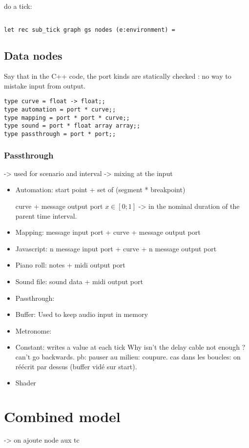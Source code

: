 \documentclass[applsci,article,submit,moreauthors,pdftex,10pt,a4paper]{mdpi}
\begin{document}
do a tick: 

\begin{lstlisting}

let rec sub_tick graph gs nodes (e:environment) =
\end{lstlisting}


\subsection{Data nodes}
Say that in the C++ code, the port kinds are statically checked : no way to mistake input from output.
\begin{lstlisting}
type curve = float -> float;;
type automation = port * curve;;
type mapping = port * port * curve;;
type sound = port * float array array;;
type passthrough = port * port;;
\end{lstlisting}
\subsubsection{Passthrough}
-> used for scenario and interval
-> mixing at the input

\begin{itemize}
\item Automation: 
start point + set of (segment * breakpoint)

curve + message output port
$x\in[0;1]$ -> in the nominal duration of the parent time interval.

\item Mapping: message input port + curve + message output port
\item Javascript:  n message input port + curve + n message output port
\item Piano roll:  notes + midi output port
\item Sound file: sound data + midi output port
\item Passthrough:
\item Buffer: Used to keep audio input in memory
\item Metronome: 
\item Constant: writes a value at each tick
Why isn't the delay cable not enough ? can't go backwards. 
pb: pauser au milieu: coupure. cas dans les boucles: on réécrit par dessus (buffer vidé sur start).
\item Shader
\end{itemize}


\section{Combined model}
-> on ajoute node aux tc
\end{document}
